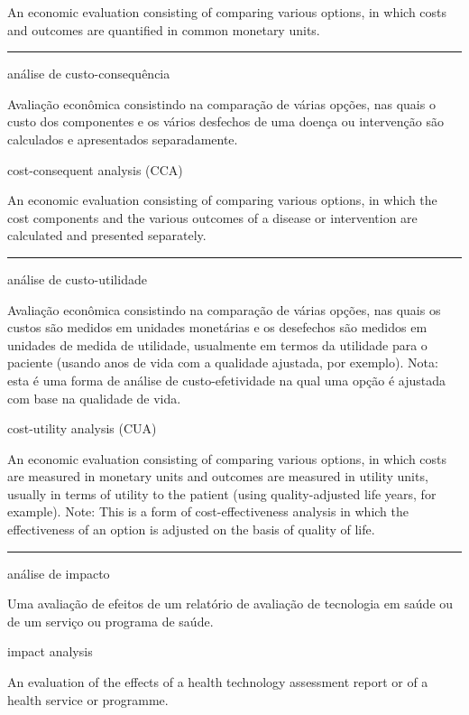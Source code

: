 \documentclass[
  openany]{book}
\begin{document}
An economic evaluation consisting of comparing various options, in which costs and outcomes are quantified in common monetary units.

\begin{center}\rule{0.5\linewidth}{0.5pt}\end{center}

análise de custo-consequência

Avaliação econômica consistindo na comparação de várias opções, nas quais o custo dos componentes e os vários desfechos de uma doença ou intervenção são calculados e apresentados separadamente.

cost-consequent analysis (CCA)

An economic evaluation consisting of comparing various options, in which the cost components and the various outcomes of a disease or intervention are calculated and presented separately.

\begin{center}\rule{0.5\linewidth}{0.5pt}\end{center}

análise de custo-utilidade

Avaliação econômica consistindo na comparação de várias opções, nas quais os custos são medidos em unidades monetárias e os desefechos são medidos em unidades de medida de utilidade, usualmente em termos da utilidade para o paciente (usando anos de vida com a qualidade ajustada, por exemplo). Nota: esta é uma forma de análise de custo-efetividade na qual uma opção é ajustada com base na qualidade de vida.

cost-utility analysis (CUA)

An economic evaluation consisting of comparing various options, in which costs are measured in monetary units and outcomes are measured in utility units, usually in terms of utility to the patient (using quality-adjusted life years, for example). Note: This is a form of cost-effectiveness analysis in which the effectiveness of an option is adjusted on the basis of quality of life.

\begin{center}\rule{0.5\linewidth}{0.5pt}\end{center}

análise de impacto

Uma avaliação de efeitos de um relatório de avaliação de tecnologia em saúde ou de um serviço ou programa de saúde.

impact analysis

An evaluation of the effects of a health technology assessment report or of a health service or programme.
\end{document}
